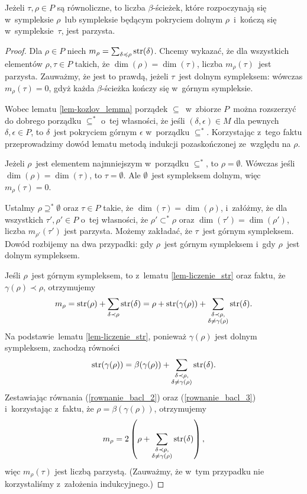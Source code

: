 \begin{lem}\label{lem-o_parzystosci}
Jeżeli $\tau,\rho\in P$ są równoliczne, to liczba $\beta$-ścieżek, które rozpoczynają się w~sympleksie $\rho$~lub sympleksie będącym pokryciem dolnym $\rho$~i~kończą się w~sympleksie~$\tau$, jest parzysta.
\end{lem}
\begin{proof}
Dla $\rho\in P$ niech $m_\rho=\sum_{\delta\preccurlyeq \rho}\operatorname{str}(\delta)$. Chcemy wykazać, że dla wszystkich elementów $\rho,\tau\in P$ takich, że $\dim(\rho)=\dim(\tau)$, liczba $m_\rho(\tau)$~jest parzysta. Zauważmy, że jest to prawdą, jeżeli $\tau$~jest dolnym sympleksem: wówczas $m_\rho(\tau)=0$, gdyż każda $\beta$-ścieżka kończy się w~górnym sympleksie.

Wobec lematu \ref{lem-kozlov_lemma} porządek $\subseteq$~w~zbiorze $P$~można rozszerzyć do dobrego porządku $\subseteq^*$ o~tej własności, że jeśli $(\delta,\epsilon)\in M$ dla pewnych $\delta,\epsilon\in P$, to $\delta$~jest pokryciem górnym $\epsilon$ w~porządku $\subseteq^*$. Korzystając z~tego faktu przeprowadzimy dowód lematu metodą indukcji pozaskończonej ze~względu na $\rho$.

Jeżeli $\rho$~jest elementem najmniejszym w~porządku $\subseteq^*$, to $\rho=\emptyset$. Wówczas jeśli $\dim(\rho)=\dim(\tau)$, to $\tau=\emptyset$. Ale $\emptyset$~jest sympleksem dolnym, więc $m_\rho(\tau)=0$. 

Ustalmy $\rho\supseteq^*\emptyset$ oraz $\tau\in P$ takie, że $\dim(\tau)=\dim(\rho)$, i~załóżmy, że dla wszystkich $\tau',\rho'\in P$ o~tej własności, że $\rho'\subset^*\rho$ oraz $\dim(\tau')=\dim(\rho')$, liczba $m_{\rho'}(\tau')$ jest parzysta. Możemy zakładać, że $\tau$~jest górnym sympleksem. Dowód rozbijemy na dwa przypadki: gdy $\rho$~jest górnym sympleksem i~gdy $\rho$~jest dolnym sympleksem.

Jeśli $\rho$~jest górnym sympleksem, to z~lematu \ref{lem-liczenie_str} oraz faktu, że $\gamma(\rho)\prec\rho$, otrzymujemy \begin{align}m_\rho=\operatorname{str}(\rho)+\sum_{\delta\prec\rho}\operatorname{str}(\delta)=\rho+\operatorname{str}(\gamma(\rho))+\sum_{\substack{\delta\prec\rho,\\\delta\not=\gamma(\rho)}}\operatorname{str}(\delta).\label{rownanie_bacl_2}\end{align} Na podstawie~lematu \ref{lem-liczenie_str}, ponieważ $\gamma(\rho)$ jest dolnym sympleksem, zachodzą równości \begin{align}\operatorname{str}(\gamma(\rho))=\beta(\gamma(\rho))+\sum_{\substack{\delta\prec\rho,\\\delta\not=\gamma(\rho)}}\operatorname{str}(\delta).\label{rownanie_bacl_3}\end{align} Zestawiając równania (\ref{rownanie_bacl_2}) oraz (\ref{rownanie_bacl_3}) i~korzystając z~faktu, że $\rho=\beta(\gamma(\rho))$, otrzymujemy
\[m_\rho=2\left(\rho+\sum_{\substack{\delta\prec\rho,\\\delta\not=\gamma(\rho)}}\operatorname{str}(\delta)\right),\]
więc $m_\rho(\tau)$ jest liczbą parzystą. (Zauważmy, że w~tym przypadku nie korzystaliśmy z~założenia indukcyjnego.)


\end{proof}
